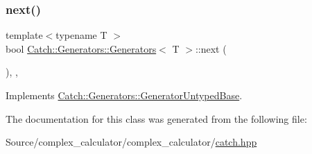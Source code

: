 \subsubsection{\texorpdfstring{next()}{next()}}
{\footnotesize\ttfamily template$<$typename T $>$ \\
bool \mbox{\hyperlink{class_catch_1_1_generators_1_1_generators}{Catch\+::\+Generators\+::\+Generators}}$<$ T $>$\+::next (\begin{DoxyParamCaption}{ }\end{DoxyParamCaption})\hspace{0.3cm}{\ttfamily [inline]}, {\ttfamily [override]}, {\ttfamily [virtual]}}



Implements \mbox{\hyperlink{class_catch_1_1_generators_1_1_generator_untyped_base_aeed3c0cd6233c5f553549e453b8d6638}{Catch\+::\+Generators\+::\+Generator\+Untyped\+Base}}.



The documentation for this class was generated from the following file\+:\begin{DoxyCompactItemize}
\item 
Source/complex\+\_\+calculator/complex\+\_\+calculator/\mbox{\hyperlink{catch_8hpp}{catch.\+hpp}}\end{DoxyCompactItemize}
